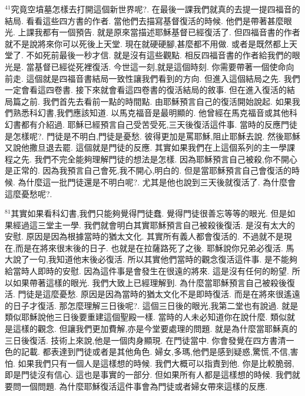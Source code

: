 \documentclass{book}
\begin{document}
$^{41}$究竟空墳墓怎樣去打開這個新世界呢?.
在最後一課我們就真的去提一提四福音的結局.
看看這些四方書的作者.
當他們去描寫基督復活的時候.
他們是帶著甚麼眼光.
上課我都有一個預告.
就是原來當描述耶穌基督已經復活了.
但四福音書的作者就不是說將來你可以死後上天堂.
現在就硬硬腳,甚麼都不用做.
或者是既然都上天堂了.
不如死前最後一秒才信.
就是沒有這些觀點.
相反四福音書的作者給我們的眼光是.
當基督已經從死裡復活.
今世這一刻,就是這個時刻.
你需要帶著一個使命向前走.
這個就是四福音書結局一致性讓我們看到的方向.
但進入這個結局之先.
我們一定會看這四卷書.
接下來就會看這四卷書的復活結局的敘事.
但在進入復活的結局篇之前.
我們首先去看前一點的時間點.
由耶穌預言自己的復活開始說起.
如果我們熟悉科幻書,我們應該知道.
以馬克福音是最明顯的.
他曾經在馬克福音或其他科幻書都有介紹過.
耶穌已經預言自己受苦受死,三天後復活這件事.
當時的反應門徒是怎樣呢?.
門徒是不明白,門徒是憂愁.
彼得更加是罵耶穌,阻止耶穌去說.
然後耶穌又說他撒旦退去罷.
這個就是門徒的反應.
其實如果我們在上這個系列的主一學課程之先.
我們不完全能夠理解門徒的想法是怎樣.
因為耶穌預言自己被殺,你不開心是正常的.
因為我預言自己會死,我不開心,明白的.
但是當耶穌預言自己會復活的時候.
為什麼這一批門徒還是不明白呢?.
尤其是他也說到三天後就復活了.
為什麼會這麼憂愁呢?.

$^{81}$其實如果看科幻書,我們只能夠覺得門徒蠢.
覺得門徒很善忘等等的眼光.
但是如果經過這三堂主一學.
我們就會明白其實耶穌預言自己被殺後復活.
是沒有太大的安慰.
原因是因為根據當時的猶太文化.
其實所有義人都會復活的.
不過就不是現在,而是在將來很末後的日子.
也就是在拉薩路死了之後.
耶穌說你兄弟必復活.
馬大說了一句,我知道他末後必復活.
所以其實他們當時的觀念復活這件事.
是不能夠給當時人即時的安慰.
因為這件事是會發生在很遠的將來.
這是沒有任何的盼望.
所以如果帶著這樣的眼光.
我們大致上已經理解到.
為什麼當耶穌預言自己被殺後復活.
門徒是這麼憂愁.
原因是因為當時的猶太文化不是即時復活.
而是在將來很遙遠的日子才復活.
那怎麼理解三日後呢?.
這個三日後的眼光,我第二堂也有說過.
就是類似耶穌說他三日後要重建這個聖殿一樣.
當時的人未必知道你在說什麼.
類似就是這樣的觀念.
但讓我們更加費解,亦是今堂要處理的問題.
就是為什麼當耶穌真的三日後復活.
技術上來說,他是一個肉身顯現.
在門徒當中.
你會發覺在四方書清一色的記載.
都表達到門徒或者是其他角色.
婦女,多瑪,他們是感到疑惑,驚慌,不信,害怕.
如果我們只有一個人是這樣想的時候.
我們大概可以指責到他.
你是比較脆弱,即是門徒沒有信心.
這也是事實的一部分.
但如果所有人都是這樣想的時候.
我們就要問一個問題.
為什麼耶穌復活這件事會為門徒或者婦女帶來這樣的反應.
\end{document}

